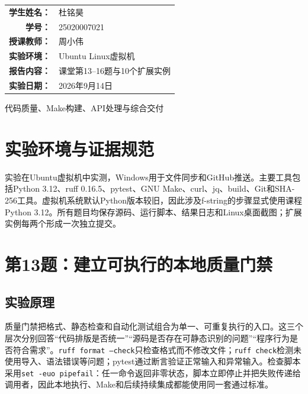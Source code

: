 \documentclass[UTF8,a4paper,11pt]{ctexart}
\begin{document}
\begin{titlepage}\centering\vspace*{1.8cm}{\Large 计算机科学与技术学院\par}\vspace{1.3cm}{\Huge\bfseries 系统开发工具基础\par}\vspace{.4cm}{\LARGE\bfseries 第四周实验报告\par}\vspace{2cm}\renewcommand{\arraystretch}{1.7}\begin{tabular}{>{\bfseries}rl}学生姓名：&杜铭昊\\学号：&25020007021\\授课教师：&周小伟\\实验环境：&Ubuntu Linux虚拟机\\报告内容：&课堂第13--16题与10个扩展实例\\实验日期：&2026年9月14日\end{tabular}\vfill{\large 代码质量、Make构建、API处理与综合交付\par}\end{titlepage}
\tableofcontents\clearpage

\section{实验环境与证据规范}
实验在Ubuntu虚拟机中实测，Windows用于文件同步和GitHub推送。主要工具包括Python 3.12、ruff 0.16.5、pytest、GNU Make、curl、jq、build、Git和SHA-256工具。虚拟机系统默认Python版本较旧，因此涉及f-string的步骤显式使用课程Python 3.12。所有题目均保存源码、运行脚本、结果日志和Linux桌面截图；扩展实例每两个形成一次独立提交。

\section{第13题：建立可执行的本地质量门禁}
\subsection{实验原理}
质量门禁把格式、静态检查和自动化测试组合为单一、可重复执行的入口。这三个层次分别回答“代码排版是否统一”“源码是否存在可静态识别的问题”“程序行为是否符合需求”。\texttt{ruff format --check}只检查格式而不修改文件；\texttt{ruff check}检测未使用导入、语法错误等问题；pytest通过断言验证正常输入和异常输入。检查脚本采用\texttt{set -euo pipefail}：任一命令返回非零状态，脚本立即停止并把失败传递给调用者，因此本地执行、Make和后续持续集成都能使用同一套通过标准。
\end{document}
